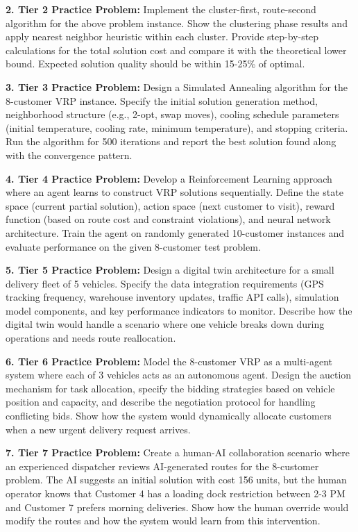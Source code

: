 \documentclass{article}
\begin{document}
\textbf{2. Tier 2 Practice Problem:} Implement the cluster-first, route-second algorithm for the above problem instance. Show the clustering phase results and apply nearest neighbor heuristic within each cluster. Provide step-by-step calculations for the total solution cost and compare it with the theoretical lower bound. Expected solution quality should be within 15-25\% of optimal.

\textbf{3. Tier 3 Practice Problem:} Design a Simulated Annealing algorithm for the 8-customer VRP instance. Specify the initial solution generation method, neighborhood structure (e.g., 2-opt, swap moves), cooling schedule parameters (initial temperature, cooling rate, minimum temperature), and stopping criteria. Run the algorithm for 500 iterations and report the best solution found along with the convergence pattern.

\textbf{4. Tier 4 Practice Problem:} Develop a Reinforcement Learning approach where an agent learns to construct VRP solutions sequentially. Define the state space (current partial solution), action space (next customer to visit), reward function (based on route cost and constraint violations), and neural network architecture. Train the agent on randomly generated 10-customer instances and evaluate performance on the given 8-customer test problem.

\textbf{5. Tier 5 Practice Problem:} Design a digital twin architecture for a small delivery fleet of 5 vehicles. Specify the data integration requirements (GPS tracking frequency, warehouse inventory updates, traffic API calls), simulation model components, and key performance indicators to monitor. Describe how the digital twin would handle a scenario where one vehicle breaks down during operations and needs route reallocation.

\textbf{6. Tier 6 Practice Problem:} Model the 8-customer VRP as a multi-agent system where each of 3 vehicles acts as an autonomous agent. Design the auction mechanism for task allocation, specify the bidding strategies based on vehicle position and capacity, and describe the negotiation protocol for handling conflicting bids. Show how the system would dynamically allocate customers when a new urgent delivery request arrives.

\textbf{7. Tier 7 Practice Problem:} Create a human-AI collaboration scenario where an experienced dispatcher reviews AI-generated routes for the 8-customer problem. The AI suggests an initial solution with cost 156 units, but the human operator knows that Customer 4 has a loading dock restriction between 2-3 PM and Customer 7 prefers morning deliveries. Show how the human override would modify the routes and how the system would learn from this intervention.
\end{document}
